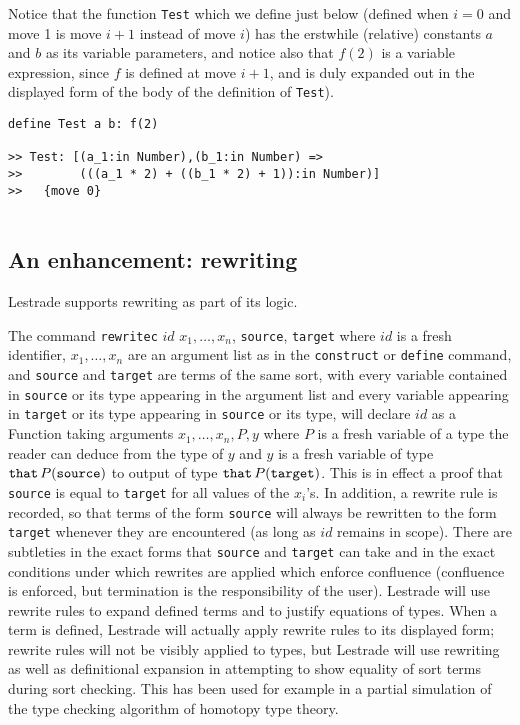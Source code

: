 \documentclass{article}
\begin{document}
 Notice that the function {\tt Test} which we define just below (defined when $i=0$ and move 1 is move $i+1$ instead of move $i$) has the erstwhile (relative) constants $a$ and $b$ as its variable parameters, and notice also that $f(2)$ is a variable expression, since $f$ is defined at move $i+1$, and is duly expanded out in the displayed form of the body of the definition of {\tt Test}).

\begin{verbatim}
define Test a b: f(2)

>> Test: [(a_1:in Number),(b_1:in Number) => 
>>        (((a_1 * 2) + ((b_1 * 2) + 1)):in Number)]
>>   {move 0}


\end{verbatim}



\subsection{An enhancement: rewriting}

Lestrade supports rewriting as part of its logic.

The command {\tt rewritec} $id$ $x_1, \ldots, x_n$, {\tt source}, {\tt target}  where $id$ is a fresh identifier, $x_1, \ldots, x_n$ are an argument list as in the {\tt construct} or {\tt define} command, and {\tt source} and {\tt target} are terms of the same sort, with every variable contained in {\tt source} or its type appearing in the argument list and every variable appearing in {\tt target} or its type appearing in {\tt source} or its type, will declare $id$ as a Function taking arguments $x_1,\ldots,x_n,P,y$ where $P$ is a fresh variable of a type the reader can deduce from the type of $y$ and $y$ is a fresh variable of type
${\tt that} \,P({\tt source})$ to output of type ${\tt that}\, P({\tt target})$.  This is in effect a proof that {\tt source} is equal to {\tt target} for all values of the $x_i$'s.  In addition, a rewrite rule is recorded, so that terms of the form {\tt source} will always be rewritten to the form {\tt target} whenever they are encountered (as long as $id$ remains in scope).  There are subtleties in the exact forms that {\tt source} and {\tt target} can take and in the exact conditions under which rewrites are applied which enforce confluence (confluence is enforced, but termination is the responsibility of the user).  Lestrade will use rewrite rules to expand defined terms and to justify equations of types.   When a term is defined, Lestrade will actually apply rewrite rules to its displayed form;  rewrite rules will not be visibly applied to types, but Lestrade will use rewriting as well as definitional expansion in attempting to show equality of sort terms during sort checking.   This has been used for example in a partial simulation of the type checking algorithm of homotopy type theory. 
\end{document}
